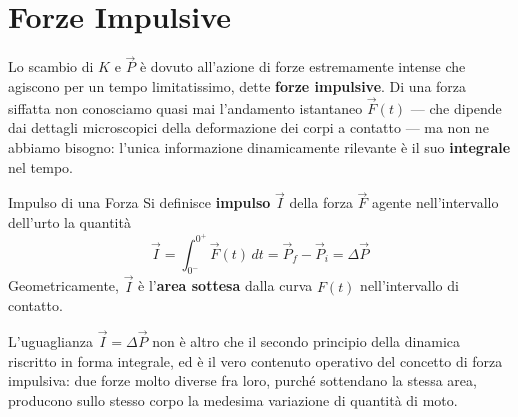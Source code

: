 \section{Forze Impulsive}

Lo scambio di $K$ e $\vec{P}$ è dovuto all'azione di forze estremamente intense che agiscono per un tempo limitatissimo, dette \textbf{forze impulsive}. Di una forza siffatta non conosciamo quasi mai l'andamento istantaneo $\vec{F}(t)$ --- che dipende dai dettagli microscopici della deformazione dei corpi a contatto --- ma non ne abbiamo bisogno: l'unica informazione dinamicamente rilevante è il suo \textbf{integrale} nel tempo.

\begin{definizione}{Impulso di una Forza}
Si definisce \textbf{impulso} $\vec{I}$ della forza $\vec{F}$ agente nell'intervallo dell'urto la quantità
\begin{equation}
    \vec{I} = \int_{0^-}^{0^+} \vec{F}(t) \, dt = \vec{P}_f - \vec{P}_i = \Delta \vec{P}
\end{equation}
Geometricamente, $\vec{I}$ è l'\textbf{area sottesa} dalla curva $F(t)$ nell'intervallo di contatto.
\end{definizione}

L'uguaglianza $\vec{I} = \Delta\vec{P}$ non è altro che il secondo principio della dinamica riscritto in forma integrale, ed è il vero contenuto operativo del concetto di forza impulsiva: due forze molto diverse fra loro, purché sottendano la stessa area, producono sullo stesso corpo la medesima variazione di quantità di moto.

